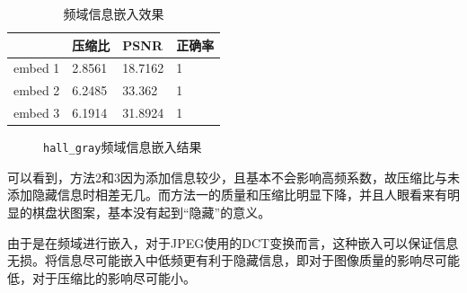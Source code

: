 \documentclass[10pt, a4paper]{article}
\begin{document}
\begin{table}[h]
    \centering
    \caption{频域信息嵌入效果}
    \label{tab:exp3_2}
    \begin{tabular}{llll}
        \hline
                & 压缩比 & PSNR    & 正确率 \\ \hline
        embed 1 & 2.8561 & 18.7162 & 1      \\
        embed 2 & 6.2485 & 33.362  & 1      \\
        embed 3 & 6.1914 & 31.8924 & 1      \\ \hline
    \end{tabular}
\end{table}

\begin{figure}[h]
    \centering
    \quad
    \quad
    \caption{\texttt{hall_gray}频域信息嵌入结果}
    \label{fig:exp3_2}
\end{figure}

可以看到，方法2和3因为添加信息较少，且基本不会影响高频系数，故压缩比与未添加隐藏信息时相差无几。而方法一的质量和压缩比明显下降，并且人眼看来有明显的棋盘状图案，基本没有起到“隐藏”的意义。

由于是在频域进行嵌入，对于JPEG使用的DCT变换而言，这种嵌入可以保证信息无损。将信息尽可能嵌入中低频更有利于隐藏信息，即对于图像质量的影响尽可能低，对于压缩比的影响尽可能小。
\end{document}

